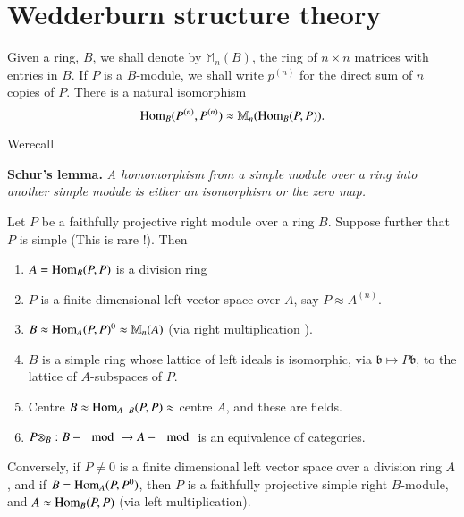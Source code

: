 \section{Wedderburn structure theory} %

Given a ring, $B$, we shall denote by $\mathbb{M}_n (B)$, the ring of
$n \times n$ matrices with entries in $B$. If $P$ is a $B$-module, we
shall write $p^{(n)}$ for the direct sum of $n$ copies of $P$. There
is a natural isomorphism  
$$
\operatorname{Hom}_B (P^{(n)}, P^{(n)}) \approx \mathbb{M}_n (\operatorname{Hom}_B (P, P)).  
$$

We\pageoriginale recall

\medskip
\noindent
\textbf{Schur's lemma.}
\textit{A homomorphism from a simple module over a ring into another
  simple module is either an isomorphism or the zero map.}  

\begin{theorem}\label{chap2:thm6.1}%
Let $P$ be a faithfully projective right module over a ring
$B$. Suppose further that $P$ is simple (This is rare !). Then  
\begin{enumerate}[(1)]
\item $A = \operatorname{Hom}_B (P, P)$ is a division ring  

\item $P$ is a finite dimensional left vector space over $A$, say  $P
  \approx A^{(n)}$.  

\item $B \approx \operatorname{Hom}_A (P, P)^0  \approx \mathbb{M}_n(A)$ (via right
  multiplication ). 

\item $B$ is a simple ring  whose lattice of left ideals is
  isomorphic, via $\mathfrak{b} \mapsto P \mathfrak{b}$, to the
  lattice of $A$-subspaces of $P$.  

\item Centre $B \approx \operatorname{Hom}_{A- B} (P, P) \approx$ centre $A$, and these
  are fields.  

\item $P \otimes_B: B - \mod  \to A- \mod $ is an equivalence of
  categories.  
\end{enumerate}

Conversely, if $P \neq 0$ is a finite dimensional left vector space
over a division ring $A$, and if $B= \operatorname{Hom}_A (P, P^0)$, then $P$ is a
faithfully projective simple right $B$-module, and $A \approx
\operatorname{Hom}_B(P, P)$ (via left multiplication).  
\end{theorem}

